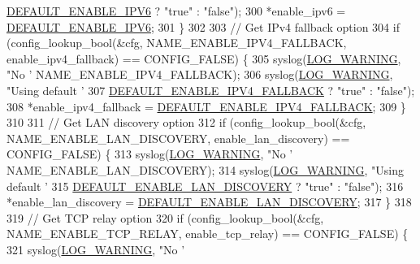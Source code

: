 \begin{DoxyCode}
{{{{{{{{{      \hyperlink{tox-bootstrapd_8c_a67663ba00c576efce1226a3fd856cba6}{DEFAULT\_ENABLE\_IPV6} ? \textcolor{stringliteral}{"true"} : \textcolor{stringliteral}{"false"});
300         *enable\_ipv6 = \hyperlink{tox-bootstrapd_8c_a67663ba00c576efce1226a3fd856cba6}{DEFAULT\_ENABLE\_IPV6};
301     \}
302 
303     \textcolor{comment}{// Get IPv4 fallback option}
304     \textcolor{keywordflow}{if} (config\_lookup\_bool(&cfg, NAME\_ENABLE\_IPV4\_FALLBACK, enable\_ipv4\_fallback) == CONFIG\_FALSE) \{
305         syslog(\hyperlink{logger_8h_aa5a9053636a30269210c54e734e0d583a8f6fe15bfe15104da6d1b360194a5400}{LOG\_WARNING}, \textcolor{stringliteral}{"No '%
      NAME\_ENABLE\_IPV4\_FALLBACK);
306         syslog(\hyperlink{logger_8h_aa5a9053636a30269210c54e734e0d583a8f6fe15bfe15104da6d1b360194a5400}{LOG\_WARNING}, \textcolor{stringliteral}{"Using default '%
307                \hyperlink{tox-bootstrapd_8c_a51d848d37bbf1d506ca14f83ddd2e342}{DEFAULT\_ENABLE\_IPV4\_FALLBACK} ? \textcolor{stringliteral}{"true"} : \textcolor{stringliteral}{"false"});
308         *enable\_ipv4\_fallback = \hyperlink{tox-bootstrapd_8c_a51d848d37bbf1d506ca14f83ddd2e342}{DEFAULT\_ENABLE\_IPV4\_FALLBACK};
309     \}
310 
311     \textcolor{comment}{// Get LAN discovery option}
312     \textcolor{keywordflow}{if} (config\_lookup\_bool(&cfg, NAME\_ENABLE\_LAN\_DISCOVERY, enable\_lan\_discovery) == CONFIG\_FALSE) \{
313         syslog(\hyperlink{logger_8h_aa5a9053636a30269210c54e734e0d583a8f6fe15bfe15104da6d1b360194a5400}{LOG\_WARNING}, \textcolor{stringliteral}{"No '%
      NAME\_ENABLE\_LAN\_DISCOVERY);
314         syslog(\hyperlink{logger_8h_aa5a9053636a30269210c54e734e0d583a8f6fe15bfe15104da6d1b360194a5400}{LOG\_WARNING}, \textcolor{stringliteral}{"Using default '%
315                \hyperlink{tox-bootstrapd_8c_a78c8c9f7a2ece92a6e6cab895c88962e}{DEFAULT\_ENABLE\_LAN\_DISCOVERY} ? \textcolor{stringliteral}{"true"} : \textcolor{stringliteral}{"false"});
316         *enable\_lan\_discovery = \hyperlink{tox-bootstrapd_8c_a78c8c9f7a2ece92a6e6cab895c88962e}{DEFAULT\_ENABLE\_LAN\_DISCOVERY};
317     \}
318 
319     \textcolor{comment}{// Get TCP relay option}
320     \textcolor{keywordflow}{if} (config\_lookup\_bool(&cfg, NAME\_ENABLE\_TCP\_RELAY, enable\_tcp\_relay) == CONFIG\_FALSE) \{
321         syslog(\hyperlink{logger_8h_aa5a9053636a30269210c54e734e0d583a8f6fe15bfe15104da6d1b360194a5400}{LOG\_WARNING}, \textcolor{stringliteral}{"No '%
}}}}}}}}}}}}}}
\end{DoxyCode}
